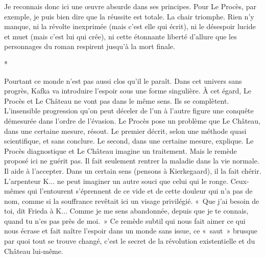 \documentclass{book}
\begin{document}
Je reconnais donc ici une œuvre absurde dans ses principes. Pour Le Procès, par exemple, je puis bien dire que la réussite est totale. La chair triomphe. Rien n'y manque, ni la révolte inexprimée (mais c'est elle qui écrit), ni le désespoir lucide et muet (mais c'est lui qui crée), ni cette étonnante liberté d'allure que les personnages du roman respirent jusqu'à la mort finale.

\begin{center}
*
\end{center}

Pourtant ce monde n'est pas aussi clos qu'il le paraît. Dans cet univers sans progrès, Kafka va introduire l'espoir sous une forme singulière. À cet égard, Le Procès et Le Château ne vont pas dans le même sens. Ils se complètent. L'insensible progression qu'on peut déceler de l'un à l'autre figure une conquête démesurée dans l'ordre de l'évasion. Le Procès pose un problème que Le Château, dans une certaine mesure, résout. Le premier décrit, selon une méthode quasi scientifique, et sans conclure. Le second, dans une certaine mesure, explique. Le Procès diagnostique et Le Château imagine un traitement. Mais le remède proposé ici ne guérit pas. Il fait seulement rentrer la maladie dans la vie normale. Il aide à l'accepter. Dans un certain sens (pensons à Kierkegaard), il la fait chérir. L'arpenteur K... ne peut imaginer un autre souci que celui qui le ronge. Ceux-mêmes qui l'entourent s'éprennent de ce vide et de cette douleur qui n'a pas de nom, comme si la souffrance revêtait ici un visage privilégié. « Que j'ai besoin de toi, dit Frieda à K... Comme je me sens abandonnée, depuis que je te connais, quand tu n'es pas près de moi. » Ce remède subtil qui nous fait aimer ce qui nous écrase et fait naître l'espoir dans un monde sans issue, ce « saut » brusque par quoi tout se trouve changé, c'est le secret de la révolution existentielle et du Château lui‑même.
\end{document}
